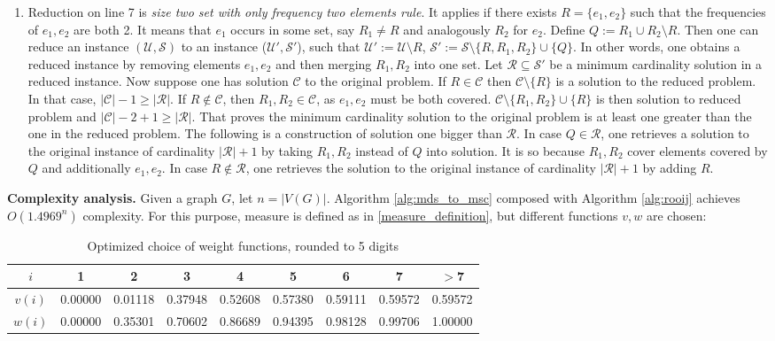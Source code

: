\begin{enumerate}
    \item Reduction on line 7 is \textit{size two set with only frequency two elements rule}. It applies if there exists $R = \{e_1, e_2\}$ such that the frequencies of $e_1, e_2$ are both 2. It means that $e_1$ occurs in some set, say $R_1 \neq R$ and analogously $R_2$ for $e_2$. Define $Q := R_1 \cup R_2 \setminus R$. Then one can reduce an instance $(\mathcal{U}, \mathcal{S})$ to an instance ($\mathcal{U'}, \mathcal{S'}$), such that $\mathcal{U'} := \mathcal{U} \setminus R$, $\mathcal{S'} := \mathcal{S}\setminus \{R, R_1, R_2\} \cup \{Q\}$. In other words, one obtains a reduced instance by removing elements $e_1, e_2$ and then merging $R_1, R_2$ into one set. Let $\mathcal{R} \subseteq \mathcal{S'}$ be a minimum cardinality solution in a reduced instance. Now suppose one has solution $\mathcal{C}$ to the original problem. If $R \in \mathcal{C}$ then $\mathcal{C} \setminus \{R\}$ is a solution to the reduced problem. In that case, $|\mathcal{C}| - 1 \geq |\mathcal{R}|$. If $R \notin \mathcal{C}$, then $R_1, R_2 \in \mathcal{C}$, as $e_1, e_2$ must be both covered. $\mathcal{C} \setminus \{R_1, R_2\} \cup \{R\}$ is then solution to reduced problem and $|\mathcal{C}| - 2 + 1 \geq |\mathcal{R}|$. That proves the minimum cardinality solution to the original problem is at least one greater than the one in the reduced problem. The following is a construction of solution one bigger than $\mathcal{R}$. In case $Q \in \mathcal{R}$, one retrieves a solution to the original instance of cardinality $|\mathcal{R}| + 1$ by taking $R_1, R_2$ instead of $Q$ into solution. It is so because $R_1, R_2$ cover elements covered by $Q$ and additionally $e_1, e_2$. In case $R \notin \mathcal{R}$, one retrieves the solution to the original instance of cardinality $|\mathcal{R}| + 1$ by adding $R$.

\end{enumerate}

\textbf{Complexity analysis.} 
Given a graph $G$, let $n = |V(G)|$. Algorithm \ref{alg:mds_to_msc} composed with Algorithm \ref{alg:rooij} achieves $O(1.4969^n)$ complexity. For this purpose, measure is defined as in \eqref{measure_definition}, but different functions $v, w$ are chosen:
\begin{table}[ht]
    \centering
    \begin{tabular}{c|c|c|c|c|c|c|c|c}
        $i$ & 1 & 2 & 3 & 4 & 5 & 6 & 7 & $>$7 \\
        \hline
        $v(i)$ & 0.00000 & 0.01118 & 0.37948 & 0.52608 & 0.57380 & 0.59111 & 0.59572 & 0.59572 \\
        \hline
        $w(i)$ & 0.00000 & 0.35301 & 0.70602 & 0.86689 & 0.94395 & 0.98128 & 0.99706 & 1.00000\\
        \hline
    \end{tabular}
    \caption{Optimized choice of weight functions, rounded to 5 digits}
\end{table}

